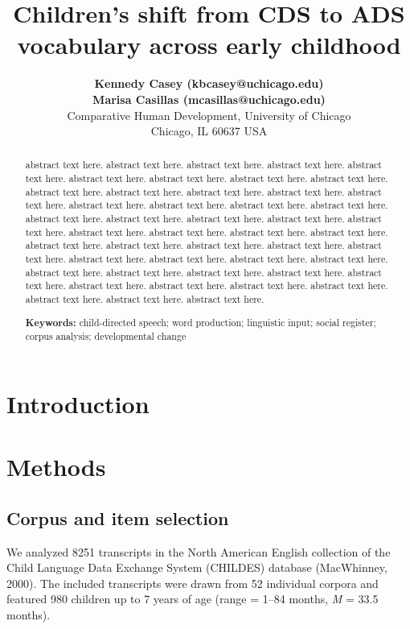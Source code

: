 \documentclass[10pt, letterpaper]{article}
\title{Children's shift from CDS to ADS vocabulary across early
childhood}
\author{{\large \bf Kennedy Casey (kbcasey@uchicago.edu)}  \\{\large \bf Marisa Casillas (mcasillas@uchicago.edu)} \\Comparative Human Development, University of Chicago \\ Chicago, IL 60637 USA}
\begin{document}
\maketitle

\begin{abstract}
abstract text here. abstract text here. abstract text here. abstract
text here. abstract text here. abstract text here. abstract text here.
abstract text here. abstract text here. abstract text here. abstract
text here. abstract text here. abstract text here. abstract text here.
abstract text here. abstract text here. abstract text here. abstract
text here. abstract text here. abstract text here. abstract text here.
abstract text here. abstract text here. abstract text here. abstract
text here. abstract text here. abstract text here. abstract text here.
abstract text here. abstract text here. abstract text here. abstract
text here. abstract text here. abstract text here. abstract text here.
abstract text here. abstract text here. abstract text here. abstract
text here. abstract text here. abstract text here. abstract text here.
abstract text here. abstract text here. abstract text here. abstract
text here. abstract text here. abstract text here.

\textbf{Keywords:}
child-directed speech; word production; linguistic input; social
register; corpus analysis; developmental change
\end{abstract}

\hypertarget{introduction}{%
\section{Introduction}\label{introduction}}

\hypertarget{methods}{%
\section{Methods}\label{methods}}

\hypertarget{corpus-and-item-selection}{%
\subsection{Corpus and item selection}\label{corpus-and-item-selection}}

We analyzed 8251 transcripts in the North American English collection of
the Child Language Data Exchange System (CHILDES) database (MacWhinney,
2000). The included transcripts were drawn from 52 individual corpora
and featured 980 children up to 7 years of age (range = 1--84 months,
\emph{M} = 33.5 months).
\end{document}
